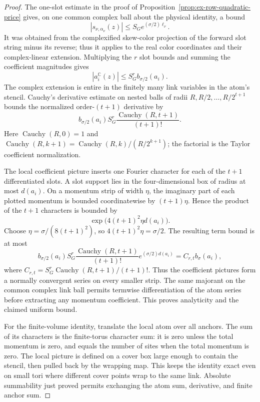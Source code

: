 \begin{proof}
The one-slot estimate in the proof of
Proposition~\ref{prop:ex-row-quadratic-price} gives, on one common complex
ball about the physical identity, a bound
\[
       |s_{\nu,\alpha_\nu}(z)|
       \leq S_G e^{(\sigma/2)\ell_\nu}.
\]
It was obtained from the complexified skew-color projection of the forward
slot string minus its reverse; thus it applies to the real color
coordinates and their complex-linear extension. Multiplying the $r$ slot
bounds and summing the coefficient magnitudes gives
\[
       |a_i^{\mathbb C}(z)|
       \leq S_G^r b_{\sigma/2}(a_i).
\]
The complex extension is entire in the finitely many link variables in the
atom's stencil. Cauchy's derivative estimate on nested balls of radii
$R,R/2,\ldots,R/2^{t+1}$ bounds the normalized order-$(t+1)$ derivative by
\[
 b_{\sigma/2}(a_i)S_G^r
       \frac{\operatorname{Cauchy}(R,t+1)}{(t+1)!}.
\]
Here $\operatorname{Cauchy}(R,0)=1$ and
$\operatorname{Cauchy}(R,k+1)=\operatorname{Cauchy}(R,k)/(R/2^{k+1})$;
the factorial is the Taylor coefficient normalization.

The local coefficient picture inserts one Fourier character for each of
the $t+1$ differentiated slots. A slot support lies in the four-dimensional
box of radius at most $d(a_i)$. On a momentum strip of width $\eta$, the
imaginary part of each plotted momentum is bounded coordinatewise by
$(t+1)\eta$. Hence the product of the $t+1$ characters is bounded by
\[
       \exp\bigl(4(t+1)^2\eta d(a_i)\bigr).
\]
Choose $\eta=\sigma/(8(t+1)^2)$, so
$4(t+1)^2\eta=\sigma/2$. The resulting term bound is at most
\[
 b_{\sigma/2}(a_i) S_G^r
 \frac{\operatorname{Cauchy}(R,t+1)}{(t+1)!}
 e^{(\sigma/2)d(a_i)}
 = C_{r,t} b_\sigma(a_i),
\]
where $C_{r,t}=S_G^r\operatorname{Cauchy}(R,t+1)/(t+1)!$.
Thus the coefficient pictures form a normally convergent series on every
smaller strip. The same majorant on the common complex link ball permits
termwise differentiation of the atom series before extracting any
momentum coefficient. This proves analyticity and the claimed uniform
bound.

For the finite-volume identity, translate the local atom over all anchors.
The sum of its characters is the finite-torus character sum: it is zero
unless the total momentum is zero, and equals the number of sites when the
total momentum is zero. The local picture is defined on a cover box large
enough to contain the stencil, then pulled back by the wrapping map. This
keeps the identity exact even on small tori where different cover points
wrap to the same link. Absolute summability just proved permits exchanging
the atom sum, derivative, and finite anchor sum.


\end{proof}

